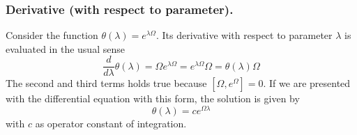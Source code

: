 \documentclass[../../../main.tex]{subfiles}
\begin{document}
\subsubsection{Derivative (with respect to parameter).}
Consider the function $\theta(\lambda)=e^{\lambda\Omega}$.
Its derivative with respect to parameter $\lambda$ is evaluated in the usual sense
\begin{equation*}
	\frac{d}{d\lambda}\theta(\lambda)=\Omega e^{\lambda\Omega}=e^{\lambda\Omega}\Omega=\theta(\lambda)\Omega
\end{equation*}
The second and third terms holds true because $[\Omega,e^{\Omega}]=0$.
If we are presented with the differential equation with this form, the solution is given by
\begin{equation*}
	\theta(\lambda)=ce^{\Omega \lambda}
\end{equation*}
with $c$ as operator constant of integration.
\end{document}
